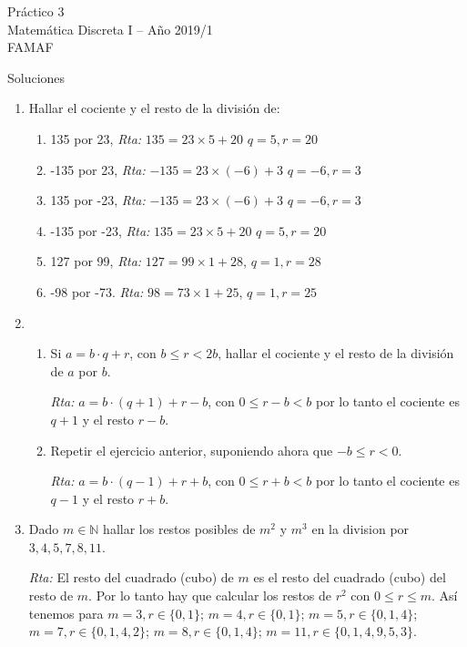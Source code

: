 \documentclass[12pt,spanish,makeidx]{amsbook}
\newcommand{\rta}{\noindent\textit{Rta: }}
\begin{document}
	
{\bf \begin{center} Práctico 3 \\ Matemática Discreta I -- Año 2019/1 \\ FAMAF \end{center}}

{\bf \begin{center} Soluciones \end{center}}

\smallskip
\begin{enumerate}

\item Hallar el cociente y el resto de la divisi\'on de:
\begin{enumerate}
\item 
135 por 23, \rta $135= 23\times 5 +20$ $q=5, r=20$
\item
-135 por 23, \rta $-135= 23\times (-6) +3$ $q=-6, r=3$
\item
135 por -23, \rta $ -135= 23\times (-6) +3$ $q=-6, r=3$
\item
-135 por -23, \rta $135= 23\times 5 +20$ $q=5, r=20$
\item
127 por 99, \rta $127=99\times1+28$, $q=1, r=28$
\item
-98 por -73. \rta $ 98=73\times 1+25$, $q=1, r=25$
\end{enumerate}
\smallskip

\item 
\begin{enumerate}
	\item Si $a=b\cdot q+r$, con $b \le r <2 b$, hallar el cociente y el resto de la divisi\'on de $a$ por $b$.
	
	\rta $a = b \cdot (q+1) + r-b$, con $0 \le r-b < b$ por lo tanto el cociente es $q+1$ y el resto  $r-b$.
	
	
	\item Repetir el ejercicio anterior, suponiendo ahora que $-b \le r < 0$.  
	
	\rta  $a = b \cdot (q-1) + r+b$, con $0 \le r+b < b$ por lo tanto el cociente es $q-1$ y el resto  $r+b$.
\end{enumerate}


\smallskip
\item Dado $m\in \mathbb N$ hallar los restos posibles de $m^2$ y $m^3$ en la division por $3,4,5,7,8, 11$.


\rta El resto del cuadrado (cubo)  de $m$ es el resto del cuadrado (cubo)  del resto de $m$.
Por lo tanto hay que calcular los restos de $r^2$ con $0\le r\le m$.
Así tenemos para $m=3, r\in\{0, 1\}$; $m=4, r\in\{0,1\}$; $m=5, r\in\{0,1,4\}$; $m=7,r\in\{0,1,4,2\}$;
$m=8, r\in\{0,1,4\}$; $m=11, r\in\{0,1,4,9,5,3\}$.


\end{enumerate}
\end{document}
